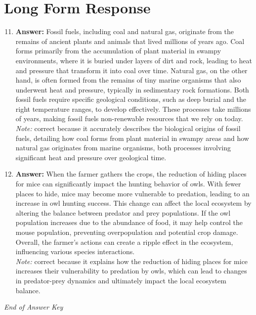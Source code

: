 \documentclass[12pt]{article}
\begin{document}
\section*{Long Form Response}
\begin{enumerate}[label=\arabic*.]
\setcounter{enumi}{10}
\item \textbf{Answer:} Fossil fuels, including coal and natural gas, originate from the remains of ancient plants and animals that lived millions of years ago. Coal forms primarily from the accumulation of plant material in swampy environments, where it is buried under layers of dirt and rock, leading to heat and pressure that transform it into coal over time. Natural gas, on the other hand, is often formed from the remains of tiny marine organisms that also underwent heat and pressure, typically in sedimentary rock formations. Both fossil fuels require specific geological conditions, such as deep burial and the right temperature ranges, to develop effectively. These processes take millions of years, making fossil fuels non-renewable resources that we rely on today.
\\ \textit{Note:} correct because it accurately describes the biological origins of fossil fuels, detailing how coal forms from plant material in swampy areas and how natural gas originates from marine organisms, both processes involving significant heat and pressure over geological time.
\item \textbf{Answer:} When the farmer gathers the crops, the reduction of hiding places for mice can significantly impact the hunting behavior of owls. With fewer places to hide, mice may become more vulnerable to predation, leading to an increase in owl hunting success. This change can affect the local ecosystem by altering the balance between predator and prey populations. If the owl population increases due to the abundance of food, it may help control the mouse population, preventing overpopulation and potential crop damage. Overall, the farmer's actions can create a ripple effect in the ecosystem, influencing various species interactions.
\\ \textit{Note:} correct because it explains how the reduction of hiding places for mice increases their vulnerability to predation by owls, which can lead to changes in predator-prey dynamics and ultimately impact the local ecosystem balance.
\end{enumerate}

\vfill
\noindent\textit{End of Answer Key}
\end{document}
